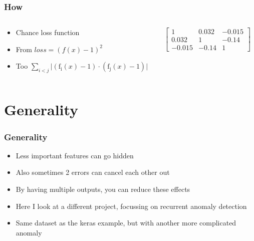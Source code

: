\documentclass[hyperref={pdfpagelabels=false}]{beamer}
\begin{document}
\begin{frame}[label=How]
\frametitle{How}
\begin{columns}[c] %
\begin{column}{0.48\textwidth}%
\begin{itemize}

    \item Chance loss function

    \item From $loss = \left(f{\left(x \right)} - 1\right)^{2}$

    \item Too $\sum_{i<j} \lvert \left(\operatorname{f_{i}}{\left(x \right)} - 1\right) \cdot \left(\operatorname{f_{j}}{\left(x \right)} - 1\right) \rvert$


\end{itemize}
\end{column}%
\hfill%
\begin{column}{0.48\textwidth}%
$ \begin{bmatrix}
1 & 0.032 & -0.015 \\
0.032 & 1 & -0.14 \\
-0.015 & -0.14 & 1 
\end{bmatrix}  $
\end{column}%
\hfill%
\end{columns}

\end{frame}



\newpage
\section{Generality}\label{sec:Generality}



\begin{frame}[label=Generality]
\frametitle{Generality}
\begin{itemize}

    \item Less important features can go hidden

    \item Also sometimes 2 errors can cancel each other out

    \item By having multiple outputs, you can reduce these effects

    \item Here I look at a different project, focussing on recurrent anomaly detection

    \item Same dataset as the keras example, but with another more complicated anomaly


\end{itemize}
\end{frame}
\end{document}
